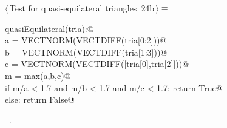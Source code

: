 \documentclass[11pt,oneside]{article}	%
\begin{document}
\begin{flushleft} \small
\begin{minipage}{\linewidth} \label{scrap60}
\protect{}$\langle\,$Test for quasi-equilateral triangles\nobreak\ {\footnotesize 24b}$\,\rangle\equiv$
\vspace{-1ex}
\begin{list}{}{} \item
\mbox{}\verb@def quasiEquilateral(tria):@\\
\mbox{}\verb@    a = VECTNORM(VECTDIFF(tria[0:2]))@\\
\mbox{}\verb@    b = VECTNORM(VECTDIFF(tria[1:3]))@\\
\mbox{}\verb@    c = VECTNORM(VECTDIFF([tria[0],tria[2]]))@\\
\mbox{}\verb@    m = max(a,b,c)@\\
\mbox{}\verb@    if m/a < 1.7 and m/b < 1.7 and m/c < 1.7: return True@\\
\mbox{}\verb@    else: return False@\\
\mbox{}\verb@@{\NWsep}
\end{list}
\vspace{-1ex}
\footnotesize\addtolength{\baselineskip}{-1ex}
\begin{list}{}{\setlength{\itemsep}{-\parsep}\setlength{\itemindent}{-\leftmargin}}
\item \NWtxtMacroRefIn\ .
\end{list}
\end{minipage}\\[4ex]
\end{flushleft}
\end{document}
